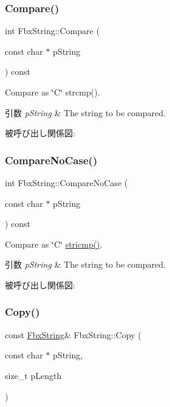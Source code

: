 \subsubsection{\texorpdfstring{Compare()}{Compare()}}
{\footnotesize\ttfamily int Fbx\+String\+::\+Compare (\begin{DoxyParamCaption}\item[{const char $\ast$}]{p\+String }\end{DoxyParamCaption}) const}

Compare as \char`\"{}\+C\char`\"{} strcmp(). 
\begin{DoxyParams}{引数}
{\em p\+String} & The string to be compared. \\
\hline
\end{DoxyParams}
被呼び出し関係図\+:
\mbox{\label{class_fbx_string_a8c7068a46cd93a53b982a97026cde255}} 
\subsubsection{\texorpdfstring{Compare\+No\+Case()}{CompareNoCase()}}
{\footnotesize\ttfamily int Fbx\+String\+::\+Compare\+No\+Case (\begin{DoxyParamCaption}\item[{const char $\ast$}]{p\+String }\end{DoxyParamCaption}) const}

Compare as \char`\"{}\+C\char`\"{} \hyperlink{fbxarch_8h_a4e0be90a3757e352f42612d09a7d1aa5}{stricmp()}. 
\begin{DoxyParams}{引数}
{\em p\+String} & The string to be compared. \\
\hline
\end{DoxyParams}
被呼び出し関係図\+:
\mbox{\label{class_fbx_string_ae9461ab3157982b492e02fec9b5503fa}} 
\subsubsection{\texorpdfstring{Copy()}{Copy()}}
{\footnotesize\ttfamily const \hyperlink{class_fbx_string}{Fbx\+String}\& Fbx\+String\+::\+Copy (\begin{DoxyParamCaption}\item[{const char $\ast$}]{p\+String,  }\item[{size\+\_\+t}]{p\+Length }\end{DoxyParamCaption})}

